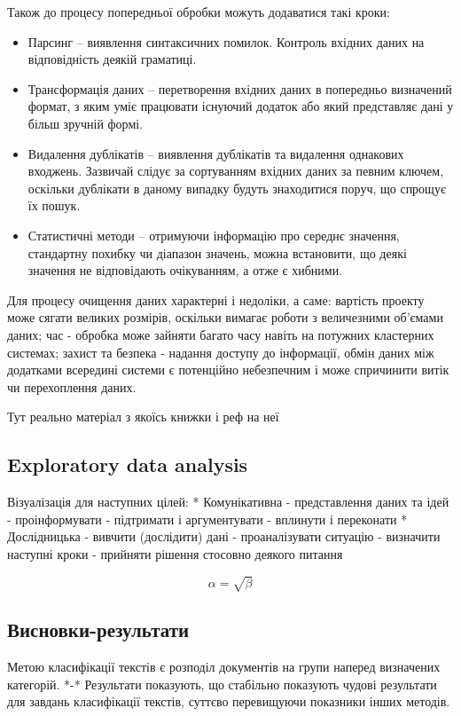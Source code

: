Також до процесу попередньої обробки можуть додаватися такі кроки:
\begin{itemize}
	\item Парсинг – виявлення синтаксичних помилок. Контроль вхідних даних на відповідність деякій граматиці.
	\item Трансформація даних – перетворення вхідних даних в попередньо визначений формат, з яким уміє працювати існуючий додаток або який представляє дані у більш зручній формі.
	\item Видалення дублікатів – виявлення дублікатів та видалення однакових входжень. Зазвичай слідує за сортуванням вхідних даних за певним ключем, оскільки дублікати в даному випадку будуть знаходитися поруч, що спрощує їх пошук.
	\item Статистичні методи – отримуючи інформацію про середнє значення, стандартну похибку чи діапазон значень, можна встановити, що деякі значення не відповідають очікуванням, а отже є хибними.
\end{itemize}

Для процесу очищення даних характерні і недоліки, а саме: вартість проекту може сягати великих розмірів, оскільки вимагає роботи з величезними об'ємами даних; час - обробка може зайняти багато часу навіть на потужних кластерних системах; захист та безпека - надання доступу до інформації, обмін даних між додатками всередині системи є потенційно небезпечним і може спричинити витік чи перехоплення даних.

Тут реально матеріал з якоїсь книжки і реф на неї \cite{book:1}

\subsection{Exploratory data analysis}
Візуалізація для наступних цілей:
* Комунікативна
- представлення даних та ідей
- проінформувати
- підтримати і аргументувати
- вплинути і переконати
* Дослідницька
- вивчити (дослідити) дані
- проаналізувати ситуацію
- визначити наступні кроки
- прийняти рішення стосовно деякого питання

\begin{equation}
    \label{simple_equation}
    \alpha = \sqrt{ \beta }
\end{equation}

\subsection{Висновки-результати}
Метою класифікації текстів є розподіл документів на групи наперед визначених категорій. *-*
Результати показують, що стабільно показують чудові результати для завдань класифікації
текстів, суттєво перевищуючи показники інших методів.

